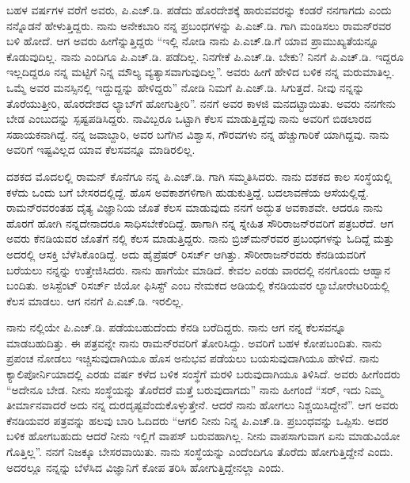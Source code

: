 ಬಹಳ ವರ್ಷಗಳ ವರೆಗೆ ಅವರು, ಪಿ.ಎಚ್.ಡಿ. ಪಡೆದು ಹೊರದೇಶಕ್ಕೆ ಹಾರುವವರನ್ನು ಕಂಡರೆ ನನಗಾಗದು ಎಂದು ನನ್ನೊಡನೆ ಹೇಳುತ್ತಿದ್ದರು. ನಾನು ಅನೇಕಬಾರಿ ನನ್ನ ಪ್ರಬಂಧಗಳನ್ನು ಪಿ.ಎಚ್.ಡಿ. ಗಾಗಿ ಮಂಡಿಸಲು ರಾಮನ್‍ರವರ ಬಳಿ ಹೋದೆ. ಆಗ ಅವರು ಹೀಗೆನ್ನುತ್ತಿದ್ದರು “ಇಲ್ಲಿ ನೋಡಿ ನಾನು ಪಿ.ಎಚ್.ಡಿ.ಗೆ ಯಾವ ಪ್ರಾಮುಖ್ಯತೆಯನ್ನೂ ಕೊಡುವುದಿಲ್ಲ. ನಾನು ಎಂದಿಗೂ ಪಿ.ಎಚ್.ಡಿ. ಪಡೆದಿಲ್ಲ. ನಿನಗೇಕೆ ಪಿ.ಎಚ್.ಡಿ. ಬೇಕು? ನಿನಗೆ ಪಿ.ಎಚ್.ಡಿ. ಇದ್ದರೂ ಇಲ್ಲದಿದ್ದರೂ ನನ್ನ ಮಟ್ಟಿಗೆ ನಿನ್ನ ಮೌಲ್ಯ ವ್ಯತ್ಯಾಸವಾಗುವುದಿಲ್ಲ”. ಅವರು ಹೀಗೆ ಹೇಳಿದ ಬಳಿಕ ನನ್ನ ಮರುಮಾತಿಲ್ಲ. ಒಮ್ಮೆ ಅವರ ಮನಸ್ಸಿನಲ್ಲಿ ಇದ್ದುದ್ದನ್ನು ಹೇಳಿದ್ದರು” ನೋಡಿ ನಿಮಗೆ ಪಿ.ಎಚ್.ಡಿ. ಸಿಗುತ್ತದೆ. ನೀವು ನನ್ನನ್ನು ತೊರೆಯುತ್ತೀರಿ, ಹೊರದೇಶದ ಲ್ಯಾಬ್‍ಗೆ ಹೋಗುತ್ತೀರಿ”. ನನಗೆ ಅವರ ಕಾಳಜಿ ಮನದಟ್ಟಾಯಿತು. ಅವರು ನನಗೇನು ಬೇಡ ಎಂಬುದನ್ನು ಸ್ಪಷ್ಟಪಡಿಸಿದ್ದರು. ನಾವಿಬ್ಬರೂ ಒಟ್ಟಾಗಿ ಕೆಲಸ ಮಾಡುತ್ತಿದ್ದೆವು ನಾನು ಅವರಿಗೆ ಬಿಡಲಾರದ ಸಹಾಯಕನಾಗಿದ್ದೆ. ನನ್ನ ಜವಾಬ್ದಾರಿ, ಅವರ ಬಗೆಗಿನ ವಿಶ್ವಾಸ, ಗೌರವಗಳು ನನ್ನ ಹೆಚ್ಚುಗಾರಿಕೆ ಯಾಗಿದ್ದವು. ನಾನು ಅವರಿಗೆ ಇಷ್ಟವಿಲ್ಲದ ಯಾವ ಕೆಲಸವನ್ನೂ ಮಾಡಿರಲಿಲ್ಲ.

 ದಶಕದ ಮೊದಲಲ್ಲಿ ರಾಮನ್ ಕೊನೆಗೂ ನನ್ನ ಪಿ.ಎಚ್.ಡಿ. ಗಾಗಿ ಸಮ್ಮತಿಸಿದರು. ನಾನು ದಶಕದ ಕಾಲ ಸಂಸ್ಥೆಯಲ್ಲಿ ಕಳೆದು ಒಂದು ಬಗೆ ಬೇಸರದಲ್ಲಿದ್ದೆ. ಹೊಸ ಅವಕಾಶಗಳಿಗಾಗಿ ಹುಡುಕುತ್ತಿದ್ದೆ. ಬದಲಾವಣೆಯ ಆಸೆಯಲ್ಲಿದ್ದೆ. ರಾಮನ್‍ರವರಂತಹ ದೈತ್ಯ ವಿಜ್ಞಾನಿಯ ಜೊತೆ ಕೆಲಸ ಮಾಡುವುದು ನನಗೆ ಅದ್ಭುತ ಅವಕಾಶವೇ. ಆದರೂ ನಾನು ಹೊರಗೆ ಹೋಗಿ ನನ್ನದೇನಾದರೂ ಸಾಧಿಸಬೇಕೆಂದಿದ್ದೆ. ಹಾಗಾಗಿ ನನ್ನ ಸ್ನೇಹಿತ ಸೌರಿರಾಜನ್‍ರವರಿಗೆ ಪತ್ರಬರೆದೆ. ಆಗ ಅವರು ಕೆನಡಿಯವರ ಜೊತೆಗೆ  ನಲ್ಲಿ ಕೆಲಸ ಮಾಡುತ್ತಿದ್ದರು. ನಾನು ಬ್ರಿಜ್‍ಮನ್‍ರವರ ಪ್ರಬಂಧಗಳನ್ನು ಓದಿದ್ದೆ ಮತ್ತು ಅದರಲ್ಲಿ ಆಸಕ್ತಿ ಬೆಳೆಸಿಕೊಂಡಿದ್ದೆ. ಅದು ಹೈಪ್ರೆಷರ್ ರಿಸರ್ಚ್ ಆಗಿತ್ತು. ಸೌರೀರಾಜನ್‍\-ರವರು ಕೆನಡಿಯವರಿಗೆ ಬರೆಯಲು ನನ್ನನ್ನು ಉತ್ತೇಜಿಸಿದರು. ನಾನು ಹಾಗೆಯೇ ಮಾಡಿದೆ. ಕೇವಲ ಎರಡು ವಾರದಲ್ಲಿ ನನಗೊಂದು ಆಹ್ವಾನ ಬಂದಿತು. ಅಸಿಸ್ಟೆಂಟ್ ರಿಸರ್ಚ್ ಜಿಯೋ ಫಿಸಿಸ್ಟ್ ಎಂಬ ನೇಮಕದ ಅಡಿಯಲ್ಲಿ ಕೆನಡಿಯವರ ಲ್ಯಾಬೋರೇಟರಿಯಲ್ಲಿ ಕೆಲಸ ಮಾಡಲು. ಆಗ ನನಗೆ ಪಿ.ಎಚ್.ಡಿ. ಇರಲಿಲ್ಲ.

ನಾನು  ನಲ್ಲಿಯೇ ಪಿ.ಎಚ್.ಡಿ. ಪಡೆಯಬಹುದೆಂದು ಕೆನಡಿ ಬರೆದಿದ್ದರು. ನಾನು ಆಗ ನನ್ನ ಕೆಲಸವನ್ನೂ ಮಾಡಬಹುದಿತ್ತು. ಈ ಪತ್ರವನ್ನೇ ನಾನು ರಾಮನ್‍ರವರಿಗೆ ತೋರಿಸಿದ್ದು. ಅವರಿಗೆ ಬಹಳ ಕೋಪಬಂದಿತು. ನಾನು ಪ್ರಪಂಚ ನೋಡಲು ಇಚ್ಚಿಸುವುದಾಗಿಯೂ ಹೊಸ ಅನುಭವ ಪಡೆಯಲು ಬಯಸುವುದಾಗಿಯೂ ಹೇಳಿದೆ. ನಾನು ಕ್ಯಾಲಿಪೋರ್ನಿಯಾದಲ್ಲಿ ಎರಡು ವರ್ಷ ಕಳೆದ ಬಳಿಕ ಸಂಸ್ಥೆಗೆ ಮರಳಿ ಬರುವುದಾಗಿಯೂ ತಿಳಿಸಿದೆ. ಅವರು ಹೀಗೆಂದರು “ಅದೇನೂ ಬೇಡ. ನೀನು ಸಂಸ್ಥೆಯನ್ನು ತೊರೆದರೆ ಮತ್ತೆ ಬರುವುದಾಗದು” ನಾನು ಹೀಗಂದೆ “ಸರ್, ಇದು ನಿಮ್ಮ ತೀರ್ಮಾನವಾದರೆ ಅದು ನನ್ನ ದುರದೃಷ್ಟವೆಂದುಕೊಳ್ಳುತ್ತೇನೆ. ಆದರೆ ನಾನು ಹೋಗಲು ನಿಶ್ಚಯಿಸಿದ್ದೇನೆ”. ಆಗ ಅವರು ಕೆನಡಿಯವರ ಪತ್ರವನ್ನು ಹಲವು ಬಾರಿ ಓದಿದರು “ಆಗಲಿ ನೀನು ನಿನ್ನ ಪಿ.ಎಚ್.ಡಿ. ಪ್ರಬಂಧವನ್ನು ಒಪ್ಪಿಸು. ಅದರ ಬಳಿಕ ಹೋಗಬಹುದು ಆದರೆ ನೀನು ಇಲ್ಲಿಗೆ ವಾಪಸ್ ಬರುವಹಾಗಿಲ್ಲ. ನೀನು ವಾಪಸಾಗುವಾಗ ಏನು ಮಾಡುವಿಯೋ ಗೊತ್ತಿಲ್ಲ”. ನನಗೆ ನಿಜಕ್ಕೂ ಬೇಸರವಾಯಿತು. ನಾನು ಸಂಸ್ಥೆಯನ್ನು ಎಂದೆಂದಿಗೂ ತೊರೆದು ಹೋಗುತ್ತಿದ್ದೇನೆ ಎಂದು. ಅದರಲ್ಲೂ ನನ್ನನ್ನು ಬೆಳೆಸಿದ ವಿಜ್ಞಾನಿಗೆ ಕೋಪ ತರಿಸಿ ಹೋಗುತ್ತಿದ್ದೇನಲ್ಲಾ ಎಂದು.

